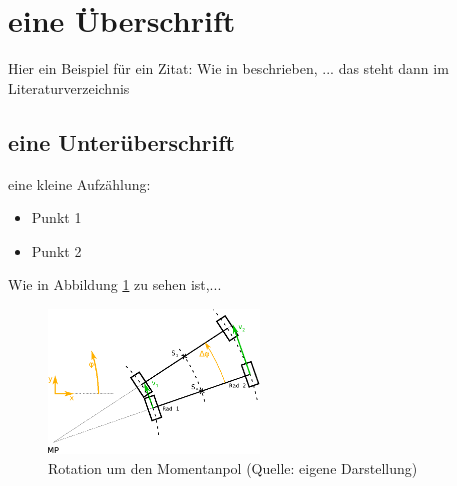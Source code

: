 

\renewcommand{\autoren}{Stephan Morongowski}
\newpage

\section{eine Überschrift}

Hier ein Beispiel für ein Zitat: Wie in \cite{bildungAtmosphaere} beschrieben, ... das steht dann im Literaturverzeichnis

\subsection{eine Unterüberschrift}
eine kleine Aufzählung:
\begin{itemize}
\item Punkt 1
\item Punkt 2
\end{itemize}

Wie in Abbildung \ref{kurvenkinematik} zu sehen ist,...

\begin{figure}[h]  %
\centering\includegraphics[width=0.5\textwidth]{images/Kurvenkinematic.eps}
\caption{Rotation um den Momentanpol \newline (Quelle: eigene Darstellung)}
\label{kurvenkinematik} %
\end{figure}

